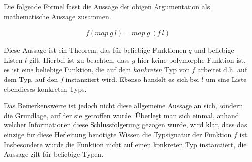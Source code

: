 Die folgende Formel fasst die Aussage der obigen Argumentation als mathematische Aussage zusammen.




\begin{align*}
f (map\ g\ l) = map\ g\ (f\ l)
\end{align*}

Diese Aussage ist ein Theorem, das für beliebige Funktionen $g$ und beliebige Listen $l$ gilt. Hierbei ist zu beachten, dass $g$ hier
keine polymorphe Funktion ist, es ist eine beliebige Funktion, die auf dem \textit{konkreten} Typ von $f$ arbeitet d.h. auf dem Typ,
auf den $f$ instanziiert wird. Ebenso handelt es sich bei $l$ um eine Liste ebendieses konkreten Typs.

Das Bemerkenswerte ist jedoch nicht diese allgemeine Aussage an sich, sondern die Grundlage, auf der sie getroffen wurde.
Überlegt man sich einmal, anhand welcher Informationen diese Schlussfolgerung gezogen wurde, wird klar, dass das einzige für
diese Herleitung benötigte Wissen die Typsignatur der Funktion $f$ ist.
Insbesondere wurde die Funktion nicht auf einen konkreten Typ instanziiert, die Aussage gilt für beliebige Typen.


